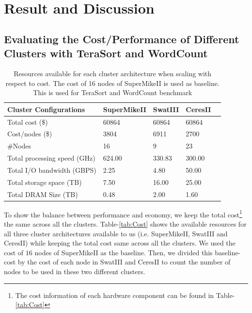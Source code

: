 \documentclass[journal]{IEEEtran}
\begin{document}
\section{Result and Discussion} \label{sec:Result}
\subsection{Evaluating the Cost/Performance of Different Clusters with TeraSort and WordCount}
\begin{table}[!t]
\caption{Resources available for each cluster architecture when scaling with respect to cost. The cost of 16 nodes of SuperMikeII is used as baseline. This is used for TeraSort and WordCount benchmark}
\label{tab:ScalingCost}
\label{fig:perf}
\centering
\begin{tabular}{|p{2.5cm}|p{1.5cm}|p{1.5cm}|p{1.5cm}|p{1.5cm}|} \hline
Cluster Configurations & SuperMikeII & SwatIII & CeresII\\ \hline
Total cost (\$) & 60864 & 60864 & 60864\\ \hline
Cost/nodes (\$) & 3804 & 6911 & 2700\\ \hline
\#Nodes & 16 & 9 & 23\\ \hline
Total processing speed (GHz) & 624.00 & 330.83 & 300.00\\ \hline
Total I/O bandwidth (GBPS) & 2.25 & 4.80 & 50.00\\ \hline
Total storage space (TB) & 7.50 & 16.00 & 25.00\\ \hline
Total DRAM Size (TB) & 0.48 & 2.00 & 1.60\\ \hline
\end{tabular}
\end{table}
To show the balance between performance and economy, we keep the total cost\footnote{The cost information of each hardware component can be found in Table-\ref{tab:Cost}} the same across all the clusters. Table-\ref{tab:Cost} shows the available resources for all three cluster architectures available to us (i.e. SuperMikeII, SwatIII and CeresII) while keeping the total cost same across all the clusters. We used the cost of $16$ nodes of SuperMikeII as the baseline. Then, we divided this baseline-cost by the cost of each node in SwatIII and CeresII to count the number of nodes to be used in these two different clusters.
\end{document}

